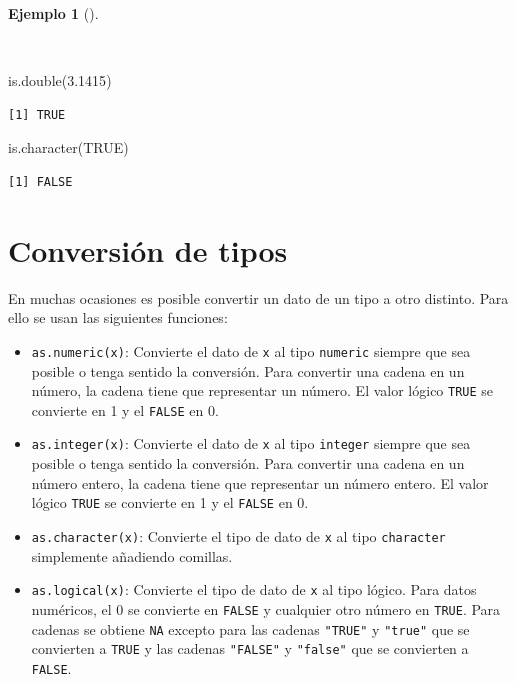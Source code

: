 \documentclass[
  a4paper,
]{scrreport}
\newenvironment{Shaded}{\begin{snugshade}}{\end{snugshade}}
\newcommand{\ConstantTok}[1]{\textcolor[rgb]{0.56,0.35,0.01}{#1}}
\newcommand{\FloatTok}[1]{\textcolor[rgb]{0.68,0.00,0.00}{#1}}
\newcommand{\FunctionTok}[1]{\textcolor[rgb]{0.28,0.35,0.67}{#1}}
\newcommand{\NormalTok}[1]{\textcolor[rgb]{0.00,0.23,0.31}{#1}}
\providecommand{\tightlist}{%
  \setlength{\itemsep}{0pt}\setlength{\parskip}{0pt}}\usepackage{longtable,booktabs,array}
\theoremstyle{definition}
\theoremstyle{definition}
\newtheorem{example}{Ejemplo}[chapter]
\theoremstyle{remark}
\begin{document}
\begin{example}[]\protect\hypertarget{exm-tipos-datos-2}{}\label{exm-tipos-datos-2}

~

\begin{Shaded}
\begin{Highlighting}[]
\FunctionTok{is.double}\NormalTok{(}\FloatTok{3.1415}\NormalTok{)}
\end{Highlighting}
\end{Shaded}

\begin{verbatim}
[1] TRUE
\end{verbatim}

\begin{Shaded}
\begin{Highlighting}[]
\FunctionTok{is.character}\NormalTok{(}\ConstantTok{TRUE}\NormalTok{)}
\end{Highlighting}
\end{Shaded}

\begin{verbatim}
[1] FALSE
\end{verbatim}

\end{example}

\hypertarget{conversiuxf3n-de-tipos}{%
\section{Conversión de tipos}\label{conversiuxf3n-de-tipos}}

En muchas ocasiones es posible convertir un dato de un tipo a otro
distinto. Para ello se usan las siguientes funciones:

\begin{itemize}
\tightlist
\item
  \texttt{as.numeric(x)}: Convierte el dato de \texttt{x} al tipo
  \texttt{numeric} siempre que sea posible o tenga sentido la
  conversión. Para convertir una cadena en un número, la cadena tiene
  que representar un número. El valor lógico \texttt{TRUE} se convierte
  en 1 y el \texttt{FALSE} en 0.
\item
  \texttt{as.integer(x)}: Convierte el dato de \texttt{x} al tipo
  \texttt{integer} siempre que sea posible o tenga sentido la
  conversión. Para convertir una cadena en un número entero, la cadena
  tiene que representar un número entero. El valor lógico \texttt{TRUE}
  se convierte en 1 y el \texttt{FALSE} en 0.
\item
  \texttt{as.character(x)}: Convierte el tipo de dato de \texttt{x} al
  tipo \texttt{character} simplemente añadiendo comillas.
\item
  \texttt{as.logical(x)}: Convierte el tipo de dato de \texttt{x} al
  tipo lógico. Para datos numéricos, el 0 se convierte en \texttt{FALSE}
  y cualquier otro número en \texttt{TRUE}. Para cadenas se obtiene
  \texttt{NA} excepto para las cadenas \texttt{"TRUE"} y \texttt{"true"}
  que se convierten a \texttt{TRUE} y las cadenas \texttt{"FALSE"} y
  \texttt{"false"} que se convierten a \texttt{FALSE}.
\end{itemize}
\end{document}
